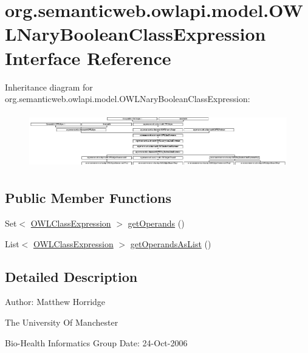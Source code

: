 \hypertarget{interfaceorg_1_1semanticweb_1_1owlapi_1_1model_1_1_o_w_l_nary_boolean_class_expression}{\section{org.\-semanticweb.\-owlapi.\-model.\-O\-W\-L\-Nary\-Boolean\-Class\-Expression Interface Reference}
\label{interfaceorg_1_1semanticweb_1_1owlapi_1_1model_1_1_o_w_l_nary_boolean_class_expression}
}
Inheritance diagram for org.\-semanticweb.\-owlapi.\-model.\-O\-W\-L\-Nary\-Boolean\-Class\-Expression\-:\begin{figure}[H]
\begin{center}
\leavevmode
\includegraphics[height=2.394299cm]{interfaceorg_1_1semanticweb_1_1owlapi_1_1model_1_1_o_w_l_nary_boolean_class_expression}
\end{center}
\end{figure}
\subsection*{Public Member Functions}
\begin{DoxyCompactItemize}
\item 
Set$<$ \hyperlink{interfaceorg_1_1semanticweb_1_1owlapi_1_1model_1_1_o_w_l_class_expression}{O\-W\-L\-Class\-Expression} $>$ \hyperlink{interfaceorg_1_1semanticweb_1_1owlapi_1_1model_1_1_o_w_l_nary_boolean_class_expression_a5baa2bd7032f47a1e9ca625f904e2716}{get\-Operands} ()
\item 
List$<$ \hyperlink{interfaceorg_1_1semanticweb_1_1owlapi_1_1model_1_1_o_w_l_class_expression}{O\-W\-L\-Class\-Expression} $>$ \hyperlink{interfaceorg_1_1semanticweb_1_1owlapi_1_1model_1_1_o_w_l_nary_boolean_class_expression_af856bc8161085edb1656f1eeef384fe4}{get\-Operands\-As\-List} ()
\end{DoxyCompactItemize}


\subsection{Detailed Description}
Author\-: Matthew Horridge\par
 The University Of Manchester\par
 Bio-\/\-Health Informatics Group Date\-: 24-\/\-Oct-\/2006 

